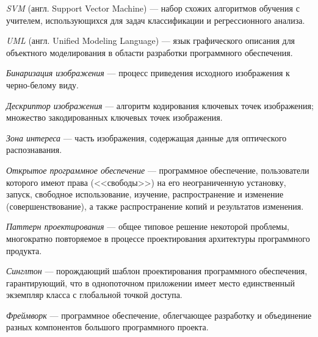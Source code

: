 \textit{SVM} (англ. Support Vector Machine) ---
набор схожих алгоритмов обучения с учителем,
использующихся для задач классификации и регрессионного анализа.

\textit{UML} (англ. Unified Modeling Language) ---
язык графического описания для объектного моделирования
в области разработки программного обеспечения.

\textit{Бинаризация изображения} ---
процесс приведения исходного
изображения к черно-белому виду.

\textit{Дескриптор изображения} ---
алгоритм кодирования ключевых точек изображения;
множество закодированных ключевых точек изображения.

\textit{Зона интереса} ---
часть изображения, содержащая данные для оптического распознавания.

\textit{Открытое программное обеспечение} ---
программное обеспечение, пользователи которого имеют права (<<свободы>>)
на его неограниченную установку, запуск, свободное использование, изучение,
распространение и изменение (совершенствование),
а также распространение копий и результатов изменения.

\textit{Паттерн проектирования} ---
общее типовое решение некоторой проблемы,
многократно повторяемое в процессе проектирования архитектуры программного продукта.

\textit{Синглтон} ---
порождающий шаблон проектирования программного обеспечения,
гарантирующий, что в однопоточном приложении имеет место единственный
экземпляр класса с глобальной точкой доступа.

\textit{Фреймворк} ---
программное обеспечение, облегчающее разработку и объединение разных компонентов
большого программного проекта.